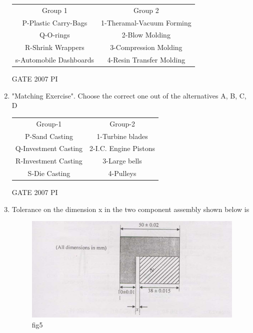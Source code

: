 \documentclass[journal,12pt,onecolumn]{IEEEtran}
\theoremstyle{remark}
\begin{document}
\begin{enumerate}
   \begin{tabular}{c|c}
   Group 1      &  Group 2\\
P-Plastic Carry-Bags         & 1-Theramal-Vacuum Forming \\
Q-O-rings & 2-Blow Molding \\
R-Shrink Wrappers & 3-Compression Molding \\
s-Automobile Dashboards & 4-Resin Transfer Molding

    \end{tabular}
    
   
  \hfill{GATE 2007 PI}
  \begin{enumerate}
  \end{enumerate}
  
  \item
  "Matching Exercise". Choose the correct one out of the alternatives A, B, C, D

  
\begin{tabular}{c|c}
    Group-1     & Group-2 \\
   P-Sand Casting & 1-Turbine blades \\
   Q-Investment Casting & 2-I.C. Engine Pistons \\
   R-Investment Casting & 3-Large bells \\
   S-Die Casting & 4-Pulleys
   \end{tabular}
   \hfill{GATE 2007 PI}
   \begin{enumerate}
   \end{enumerate}
   
   \item 
   	Tolerance on the dimension x in the two component assembly shown below is


\begin{figure}[H]
    \centering
    \includegraphics[width=0.5\linewidth]{figs/Q.39.png}
    \caption{fig5}
    \label{fig:figs/Q.39.png}
\end{figure}
       

\end{enumerate}
\end{document}

